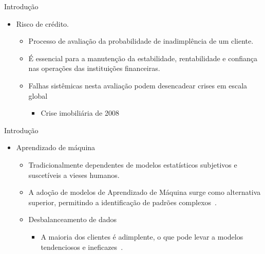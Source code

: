 \begin{frame}{Introdução}
  \begin{itemize}
    \item[$\blacktriangleright$] Risco de crédito.
      \begin{itemize}
        \item Processo de avaliação da probabilidade de inadimplência de um cliente.
        \item É essencial para a manutenção da estabilidade, rentabilidade e confiança nas operações das instituições financeiras.
        \item Falhas sistêmicas nesta avaliação podem desencadear crises em escala global
          \begin{itemize}
            \item[Exemplo:] Crise imobiliária de 2008~\cite{Christiano2008}
          \end{itemize}
      \end{itemize}
  \end{itemize}
\end{frame}

\begin{frame}{Introdução}
  \begin{itemize}
    \item[$\blacktriangleright$] Aprendizado de máquina
      \begin{itemize}
        \item Tradicionalmente dependentes de modelos estatísticos subjetivos e suscetíveis a vieses humanos.
        \item A adoção de modelos de Aprendizado de Máquina surge como alternativa superior, permitindo a identificação de padrões complexos~\cite{Shi2022}.
        \item[Problema:] Desbalanceamento de dados
          \begin{itemize}
            \item A maioria dos clientes é adimplente, o que pode levar a modelos tendenciosos e ineficazes~\cite{Namvar2018}.
          \end{itemize}
      \end{itemize}
  \end{itemize}
\end{frame}
